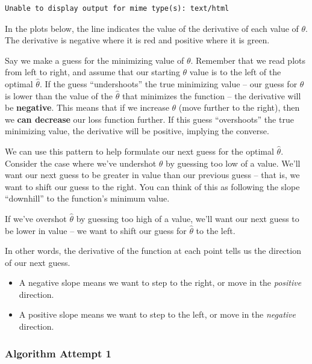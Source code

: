 \documentclass[
  letterpaper,
  DIV=11,
  numbers=noendperiod]{scrreprt}
\providecommand{\tightlist}{%
  \setlength{\itemsep}{0pt}\setlength{\parskip}{0pt}}\usepackage{longtable,booktabs,array}
\begin{document}
\begin{verbatim}
Unable to display output for mime type(s): text/html
\end{verbatim}

In the plots below, the line indicates the value of the derivative of
each value of \(\theta\). The derivative is negative where it is red and
positive where it is green.

Say we make a guess for the minimizing value of \(\theta\). Remember
that we read plots from left to right, and assume that our starting
\(\theta\) value is to the left of the optimal \(\hat{\theta}\). If the
guess ``undershoots'' the true minimizing value -- our guess for
\(\theta\) is lower than the value of the \(\hat{\theta}\) that
minimizes the function -- the derivative will be \textbf{negative}. This
means that if we increase \(\theta\) (move further to the right), then
we \textbf{can decrease} our loss function further. If this guess
``overshoots'' the true minimizing value, the derivative will be
positive, implying the converse.

We can use this pattern to help formulate our next guess for the optimal
\(\hat{\theta}\). Consider the case where we've undershot \(\theta\) by
guessing too low of a value. We'll want our next guess to be greater in
value than our previous guess -- that is, we want to shift our guess to
the right. You can think of this as following the slope ``downhill'' to
the function's minimum value.

If we've overshot \(\hat{\theta}\) by guessing too high of a value,
we'll want our next guess to be lower in value -- we want to shift our
guess for \(\hat{\theta}\) to the left.

In other words, the derivative of the function at each point tells us
the direction of our next guess.

\begin{itemize}
\tightlist
\item
  A negative slope means we want to step to the right, or move in the
  \emph{positive} direction.
\item
  A positive slope means we want to step to the left, or move in the
  \emph{negative} direction.
\end{itemize}

\subsubsection{Algorithm Attempt 1}\label{algorithm-attempt-1}
\end{document}

